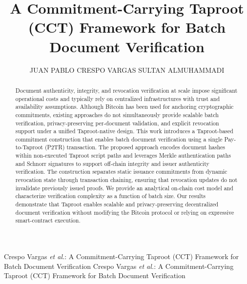 \documentclass{ieeeaccess}
\begin{document}

\title{A Commitment-Carrying Taproot (CCT) Framework for Batch Document Verification}
\author{\uppercase{Juan Pablo Crespo Vargas} %
\uppercase{Sultan Almuhammadi} %
}

\address{Information and Computer Science Department,
King Fahd University of Petroleum and Minerals,
Dhahran, Saudi Arabia
(emails: muhamadi@kfupm.edu.sa)}


\markboth
{Crespo Vargas \MakeLowercase{\textit{et al.}}: A Commitment-Carrying Taproot (CCT) Framework for Batch Document Verification}
{Crespo Vargas \MakeLowercase{\textit{et al.}}: A Commitment-Carrying Taproot (CCT) Framework for Batch Document Verification}



\begin{abstract}
Document authenticity, integrity, and revocation verification at scale impose significant operational costs and typically rely on centralized infrastructures with trust and availability assumptions.
Although Bitcoin has been used for anchoring cryptographic commitments, existing approaches do not simultaneously provide scalable batch verification, privacy-preserving per-document validation, and explicit revocation support under a unified Taproot-native design.
This work introduces a Taproot-based commitment construction that enables batch document verification using a single Pay-to-Taproot (P2TR) transaction.
The proposed approach encodes document hashes within non-executed Taproot script paths and leverages Merkle authentication paths and Schnorr signatures to support off-chain integrity and issuer authenticity verification.
The construction separates static issuance commitments from dynamic revocation state through transaction chaining, ensuring that revocation updates do not invalidate previously issued proofs.
We provide an analytical on-chain cost model and characterize verification complexity as a function of batch size.
Our results demonstrate that Taproot enables scalable and privacy-preserving decentralized document verification without modifying the Bitcoin protocol or relying on expressive smart-contract execution.
\end{abstract}
\end{document}
